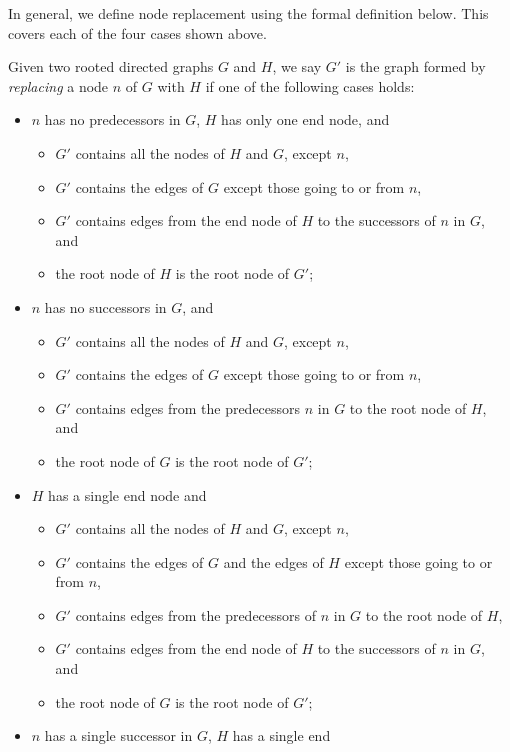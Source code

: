 In general, we define node replacement using the formal definition
below.
This covers each of the four cases shown above.
\begin{defn}
  Given two rooted directed graphs $G$ and $H$, we say $G'$ is the
  graph formed by \emph{replacing} a node $n$ of $G$ with $H$ if one
  of the following cases holds:
  \begin{itemize}
  \item $n$ has no predecessors in $G$, $H$ has only one end node, and
    \begin{itemize}
    \item $G'$ contains all the nodes of $H$ and $G$, except $n$,
    \item $G'$ contains the edges of $G$ except those going to or from
      $n$,
    \item $G'$ contains edges from the end node of $H$ to the
      successors of $n$ in $G$, and
    \item the root node of $H$ is the root node of $G'$;
    \end{itemize}
  \item $n$ has no successors in $G$, and
    \begin{itemize}
    \item $G'$ contains all the nodes of $H$ and $G$, except $n$,
    \item $G'$ contains the edges of $G$ except those going to or from
      $n$,
    \item $G'$ contains edges from the predecessors $n$ in $G$ to the
      root node of $H$, and
    \item the root node of $G$ is the root node of $G'$;
    \end{itemize}
  \item $H$ has a single end node and
    \begin{itemize}
    \item $G'$ contains all the nodes of $H$ and $G$, except $n$,
    \item $G'$ contains the edges of $G$ and the edges of $H$ except
      those going to or from $n$,
    \item $G'$ contains edges from the predecessors of $n$ in $G$ to
      the root node of $H$,
    \item $G'$ contains edges from the end node of $H$ to the
      successors of $n$ in $G$, and
    \item the root node of $G$ is the root node of $G'$;
    \end{itemize}
  \item $n$ has a single successor in $G$, $H$ has a single end

\end{itemize}
\end{defn}
